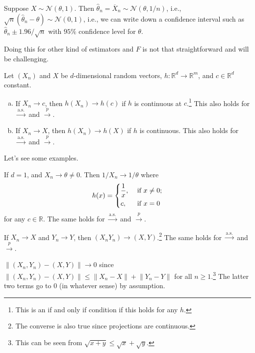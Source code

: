 \begin{eg}
	Suppose \(X \sim \mathcal{N} (\theta , 1)\). Then \(\hat{\theta} _n = \overline{X} _n \sim \mathcal{N} (\theta , 1 / n)\), i.e., \(\sqrt{n} (\hat{\theta} _n - \theta ) \sim \mathcal{N} (0, 1)\), i.e., we can write down a confidence interval such as \(\hat{\theta} _n \pm 1.96 / \sqrt{n} \) with \(95\%\) confidence level for \(\theta \).
\end{eg}

Doing this for other kind of estimators and \(F\) is not that straightforward and will be challenging.

\begin{remark}
	Let \((X_n)\) and \(X\) be \(d\)-dimensional random vectors, \(h \colon \mathbb{R} ^d \to \mathbb{R} ^m\), and \(c \in \mathbb{R} ^d\) constant.
	\begin{enumerate}[(a)]
		\item If \(X_n \to c\), then \(h(X_n) \to h(c)\) if \(h\) is continuous at \(c\).\footnote{This is an if and only if condition if this holds for any \(h\).} This also holds for \(\overset{\text{a.s.} }{\to } \) and \(\overset{p}{\to } \).
		\item If \(X_n \to X\), then \(h(X_n) \to h(X)\) if \(h\) is continuous. This also holds for \(\overset{\text{a.s.} }{\to }\) and \(\overset{p}{\to } \).
	\end{enumerate}
\end{remark}

Let's see some examples.

\begin{eg}
	If \(d = 1\), and \(X_n \to \theta \neq 0\). Then \(1 / X_n \to 1 / \theta \) where
	\[
		h(x) = \begin{dcases}
			\frac{1}{x}, & \text{ if } x \neq 0 ; \\
			c,           & \text{ if } x = 0
		\end{dcases}
	\]
	for any \(c \in \mathbb{R} \). The same holds for \(\overset{\text{a.s.} }{\to }\) and \(\overset{p}{\to } \).
\end{eg}

\begin{eg}
	If \(X_n \to X\) and \(Y_n \to Y\), then \((X_n Y_n) \to (X, Y)\).\footnote{The converse is also true since projections are continuous.} The same holds for \(\overset{\text{a.s.} }{\to } \) and \(\overset{p}{\to } \).
\end{eg}
\begin{explanation}
	\(\lVert (X_n, Y_n) - (X, Y) \rVert \to 0\) since \(\lVert (X_n, Y_n ) - (X, Y) \rVert \leq \lVert X_n - X \rVert + \lVert Y_n - Y \rVert\) for all \(n \geq 1\).\footnote{This can be seen from \(\sqrt{x + y} \leq \sqrt{x} + \sqrt{y} \).} The latter two terms go to \(0\) (in whatever sense) by assumption.
\end{explanation}